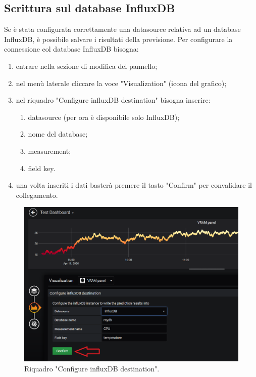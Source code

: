     \subsection{Scrittura sul database InfluxDB}
        Se è stata configurata correttamente una datasource relativa ad un database InfluxDB, è possibile salvare i risultati della previsione. Per configurare la connessione col database InfluxDB bisogna:
        \begin{enumerate}
            \item entrare nella sezione di modifica del pannello;
            \item nel menù laterale cliccare la voce "Visualization" (icona del grafico);
            \item nel riquadro "Configure influxDB destination" bisogna inserire:
            \begin{enumerate}
                \item datasource (per ora è disponibile solo InfluxDB);
                \item nome del database;
                \item measurement;
                \item field key.
            \end{enumerate}
            \item una volta inseriti i dati basterà premere il tasto "Confirm" per convalidare il collegamento.
        \end{enumerate}
        \begin{figure}[H]
            \includegraphics[width=\textwidth,height=\textheight,keepaspectratio]{img/scrittura_InfluxDB.png}
            \caption{Riquadro "Configure influxDB destination".}
        \end{figure}
